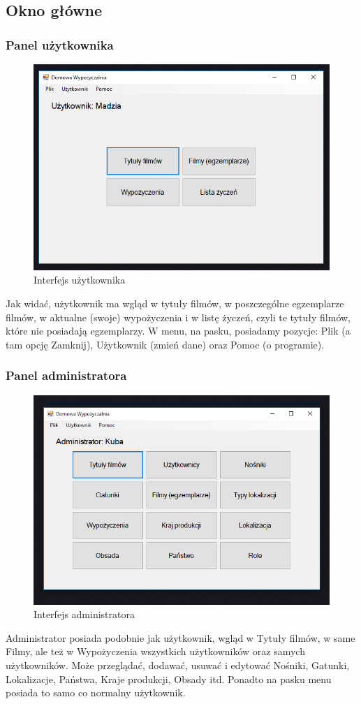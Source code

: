 \documentclass{article}
\begin{document}
\subsection{Okno główne}
\subsubsection{Panel użytkownika}
\begin{figure}[!ht]
\centering
\includegraphics[width=12cm]{userwindow.PNG}
\caption{Interfejs użytkownika}
\end{figure}
Jak widać, użytkownik ma wgląd w tytuły filmów, w poszczególne egzemplarze filmów, w aktualne (swoje) wypożyczenia i w listę życzeń, czyli te tytuły filmów, które nie posiadają egzemplarzy. W menu, na pasku, posiadamy pozycje: Plik (a tam opcję Zamknij), Użytkownik (zmień dane) oraz Pomoc (o programie).
\newpage
\subsubsection{Panel administratora}
\begin{figure}[!ht]
\centering
\includegraphics[width=12cm]{adminwindow.PNG}
\caption{Interfejs administratora}
\end{figure}
Administrator posiada podobnie jak użytkownik, wgląd w Tytuły filmów, w same Filmy, ale też w Wypożyczenia wszystkich użytkowników oraz samych użytkowników. Może przeglądać, dodawać, usuwać i edytować Nośniki, Gatunki, Lokalizacje, Państwa, Kraje produkcji, Obsady itd. Ponadto na pasku menu posiada to samo co normalny użytkownik.
\end{document}
